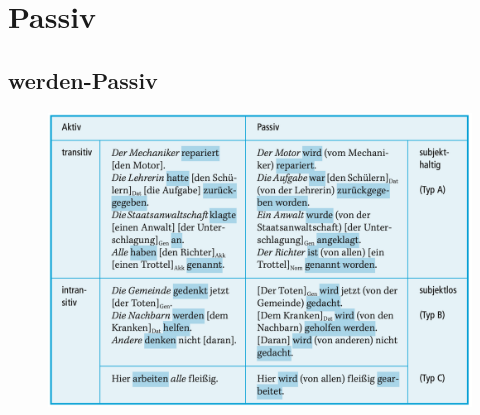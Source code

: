 \documentclass[UTF8]{report}
\begin{document}
\section{Passiv}
\subsection{werden-Passiv}
\begin{figure}[H]
    \centering
    \includegraphics[scale=0.5]{pass.png}
\end{figure}
\end{document}
